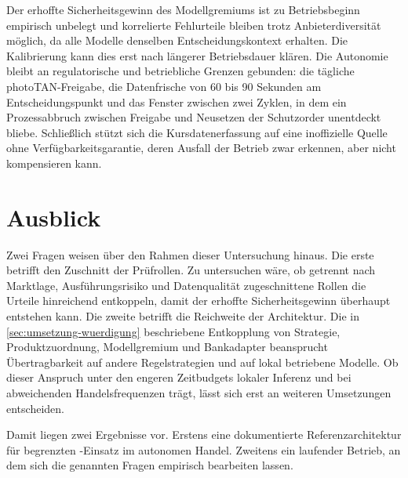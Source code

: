 Der erhoffte Sicherheitsgewinn des
Modellgremiums ist zu Betriebsbeginn empirisch unbelegt und korrelierte
Fehlurteile bleiben trotz Anbieterdiversität möglich, da alle Modelle denselben
Entscheidungskontext erhalten. Die Kalibrierung kann dies erst nach längerer
Betriebsdauer klären. Die Autonomie bleibt an regulatorische und betriebliche Grenzen gebunden: die tägliche
photoTAN-Freigabe, die Datenfrische von 60 bis 90 Sekunden am Entscheidungspunkt und das
Fenster zwischen zwei Zyklen, in dem ein Prozessabbruch zwischen Freigabe und Neusetzen der
Schutzorder unentdeckt bliebe.
Schließlich stützt sich die Kursdatenerfassung auf eine inoffizielle Quelle 
ohne Verfügbarkeitsgarantie, deren Ausfall der Betrieb zwar erkennen, 
aber nicht kompensieren kann.

\section{Ausblick}
\label{sec:ausblick}

Zwei Fragen weisen über den Rahmen dieser Untersuchung hinaus. Die erste betrifft den
Zuschnitt der Prüfrollen. Zu untersuchen wäre, ob getrennt nach Marktlage, Ausführungsrisiko
und Datenqualität zugeschnittene Rollen die Urteile hinreichend entkoppeln, damit der
erhoffte Sicherheitsgewinn überhaupt entstehen kann. Die zweite betrifft die Reichweite der
Architektur. Die in \cref{sec:umsetzung-wuerdigung} beschriebene Entkopplung von Strategie,
Produktzuordnung, Modellgremium und Bankadapter beansprucht Übertragbarkeit auf andere
Regelstrategien und auf lokal betriebene Modelle. Ob dieser Anspruch unter den engeren
Zeitbudgets lokaler Inferenz und bei abweichenden Handelsfrequenzen trägt, lässt sich erst
an weiteren Umsetzungen entscheiden.

Damit liegen zwei Ergebnisse vor. Erstens eine dokumentierte Referenzarchitektur für
begrenzten -Einsatz im autonomen Handel. Zweitens ein laufender Betrieb, an
dem sich die genannten Fragen empirisch bearbeiten lassen.

